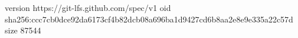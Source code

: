version https://git-lfs.github.com/spec/v1
oid sha256:ccc7cb0dce92da6173cf4b82dcb08a696ba1d9427cd6b8aa2e8e9e335a22c57d
size 87544
